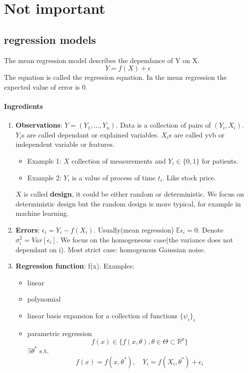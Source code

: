 \chapter{Not important}
\section{regression models}
\begin{definition}
	The mean regression model describes the dependance of Y on X.
	\begin{equation}
		Y = f(X) + \epsilon
	\end{equation}
	The equation is called the regression equation. In the mean regression the expected value of error is 0.
\end{definition}

\subsubsection*{Ingredients}
\begin{enumerate}
	\item \textbf{Observations}: $Y = (Y_1, \dots, Y_n)$. Data is a collection of pairs of $(Y_i, X_i)$. $Y_i$s are called dependant or explained variables. $X_i$s are called yvb or independent variable or features. 
		\begin{itemize}
			\item Example 1: $X$ collection of measurements and $Y_i \in \{0, 1\}$ for patients. 
			\item Example 2: $Y_i$ is a value of process of time $t_i$. Like stock price.
		\end{itemize}  $X$ is called \textbf{design}, it could be either random or deterministic. We focus on deterministic design but the random design is more typical, for example in machine learning. 
	\item \textbf{Errors}: $\epsilon_i = Y_i - f(X_i)$. Usually(mean regression) $\mathbb{E} \epsilon_i = 0$. Denote $\sigma_i^2 = Var[\epsilon_i]$. We focus on the homogeneous case(the variance does not dependant on i). Most strict case: homogenous Gaussian noise.
	\item \textbf{Regression function}: f(x). Examples: 
		\begin{itemize}
			\item linear
			\item polynomial
			\item linear basis expansion for a collection of functions $\{\psi_i \}_i$
			\item parametric regression
				\begin{equation*}
					f(x) \in \{ f(x, \theta), \theta \in \Theta \subset \mathbb{R}^p \}
				\end{equation*}
				$\exists \theta^*$ s.t.
				\begin{equation}
					f(x) = f(x, \theta^*), \quad Y_i = f(X_i, \theta^*) + \epsilon_i
				\end{equation} 
			\end{itemize}
\end{enumerate}




